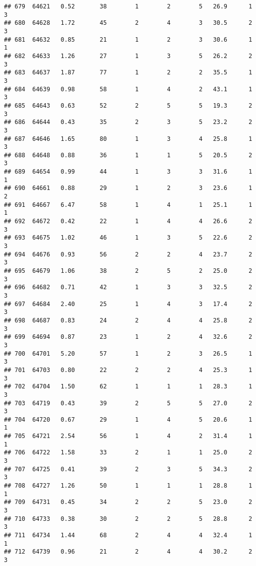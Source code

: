 \documentclass[
]{article}
\begin{document}
\begin{verbatim}
## 679  64621   0.52       38        1        2        5   26.9      1      3
## 680  64628   1.72       45        2        4        3   30.5      2      3
## 681  64632   0.85       21        1        2        3   30.6      1      1
## 682  64633   1.26       27        1        3        5   26.2      2      3
## 683  64637   1.87       77        1        2        2   35.5      1      3
## 684  64639   0.98       58        1        4        2   43.1      1      3
## 685  64643   0.63       52        2        5        5   19.3      2      3
## 686  64644   0.43       35        2        3        5   23.2      2      3
## 687  64646   1.65       80        1        3        4   25.8      1      3
## 688  64648   0.88       36        1        1        5   20.5      2      3
## 689  64654   0.99       44        1        3        3   31.6      1      1
## 690  64661   0.88       29        1        2        3   23.6      1      2
## 691  64667   6.47       58        1        4        1   25.1      1      1
## 692  64672   0.42       22        1        4        4   26.6      2      3
## 693  64675   1.02       46        1        3        5   22.6      2      3
## 694  64676   0.93       56        2        2        4   23.7      2      3
## 695  64679   1.06       38        2        5        2   25.0      2      3
## 696  64682   0.71       42        1        3        3   32.5      2      3
## 697  64684   2.40       25        1        4        3   17.4      2      3
## 698  64687   0.83       24        2        4        4   25.8      2      3
## 699  64694   0.87       23        1        2        4   32.6      2      3
## 700  64701   5.20       57        1        2        3   26.5      1      3
## 701  64703   0.80       22        2        2        4   25.3      1      3
## 702  64704   1.50       62        1        1        1   28.3      1      3
## 703  64719   0.43       39        2        5        5   27.0      2      3
## 704  64720   0.67       29        1        4        5   20.6      1      1
## 705  64721   2.54       56        1        4        2   31.4      1      1
## 706  64722   1.58       33        2        1        1   25.0      2      3
## 707  64725   0.41       39        2        3        5   34.3      2      3
## 708  64727   1.26       50        1        1        1   28.8      1      1
## 709  64731   0.45       34        2        2        5   23.0      2      3
## 710  64733   0.38       30        2        2        5   28.8      2      3
## 711  64734   1.44       68        2        4        4   32.4      1      1
## 712  64739   0.96       21        2        4        4   30.2      2      3

\end{verbatim}
\end{document}
